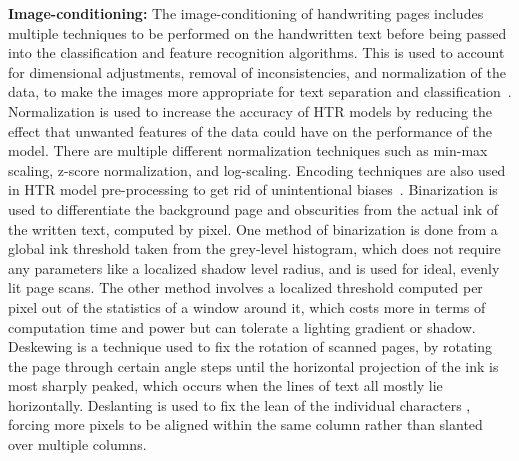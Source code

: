 \textbf{Image-conditioning:} The image-conditioning of handwriting pages includes multiple techniques to be performed on the handwritten text before being passed into the classification and feature recognition algorithms. This is used to account for dimensional adjustments, removal of inconsistencies, and normalization of the data, to make the images more appropriate for text separation and classification~\cite{hemanth2022}. Normalization is used to increase the accuracy of HTR models by reducing the effect that unwanted features of the data could have on the performance of the model. There are multiple different normalization techniques such as min-max scaling, z-score normalization, and log-scaling. Encoding techniques are also used in HTR model pre-processing to get rid of unintentional biases~\cite{chen2023}. Binarization is used to differentiate the background page and obscurities from the actual ink of the written text, computed by pixel. One method of binarization is done from a global ink threshold taken from the grey-level histogram, which does not require any parameters like a localized shadow level radius, and is used for ideal, evenly lit page scans. The other method involves a localized threshold computed per pixel out of the statistics of a window around it, which costs more in terms of computation time and power but can tolerate a lighting gradient or shadow. Deskewing is a technique used to fix the rotation of scanned pages, by rotating the page through certain angle steps until the horizontal projection of the ink is most sharply peaked, which occurs when the lines of text all mostly lie horizontally. Deslanting is used to fix the lean of the individual characters , forcing more pixels to be aligned within the same column rather than slanted over multiple columns.

